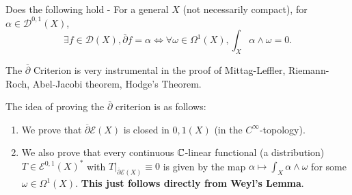 \documentclass{article}
\begin{document}
{\begin{question}
    Does the following hold -  For a general $X$ (not necessarily compact), for $\alpha \in \mathcal{D}^{0, 1}(X)$,
    \[\exists f \in \mathcal{D}(X), \overline{\partial} f = \alpha \iff \forall \omega \in \Omega^1(X), \int_X \alpha \wedge \omega = 0. \]
\end{question}

\begin{remark}
    The $\overline{\partial}$ Criterion is very instrumental in the proof of Mittag-Leffler, Riemann-Roch, Abel-Jacobi theorem, Hodge's Theorem.
\end{remark}

The idea of proving the $\overline{\partial}$ criterion is as follows:
\begin{enumerate}
    \item We prove that $\overline{\partial} \mathcal{E}(X)$ is closed in $\mathcal{0, 1}(X)$ (in the $C^\infty$-topology).
    \item We also prove that every continuous $\mathbb{C}$-linear functional (a distribution) $T \in \mathcal{E}^{0, 1}(X)^*$ with $T|_{\overline{\partial} \mathcal{E}(X)} \equiv 0$ is given by the map $\alpha \mapsto \int_X \alpha \wedge \omega$ for some $\omega \in \Omega^1(X)$. \textbf{This just follows directly from Weyl's Lemma}.
\end{enumerate}

}
\end{document}
